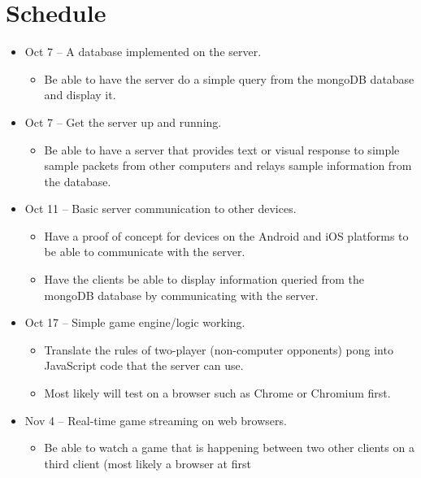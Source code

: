 \documentclass[letterpaper,12pt]{article}
\begin{document}
\section{Schedule}
\begin{itemize}
	\item Oct 7 -- A database implemented on the server.
	\begin{itemize}
		\item  Be able to have the server do a simple query from the mongoDB database and display it.
	\end{itemize}
	\item Oct 7 -- Get the server up and running. 
	\begin{itemize}
		\item Be able to have a server that provides text or visual response to simple sample packets from other computers and relays sample information from the database.
	\end{itemize}
	\item Oct 11 -- Basic server communication to other devices. 
	\begin{itemize}
		\item Have a proof of concept for devices on the Android and iOS platforms to be able to communicate with the server. 
		\item Have the clients be able to display information queried from the mongoDB database by communicating with the server.
	\end{itemize}
	\item Oct 17 -- Simple game engine/logic working.
	\begin{itemize}
		\item Translate the rules of two-player (non-computer opponents) pong into JavaScript code that the server can use.
		\item Most likely will test on a browser such as Chrome or Chromium first.
	\end{itemize}
	\item Nov 4 -- Real-time game streaming on web browsers.
	\begin{itemize}
		\item Be able to watch a game that is happening between two other clients on a third client (most likely a browser at first
	\end{itemize}
\end{itemize}
\end{document}

